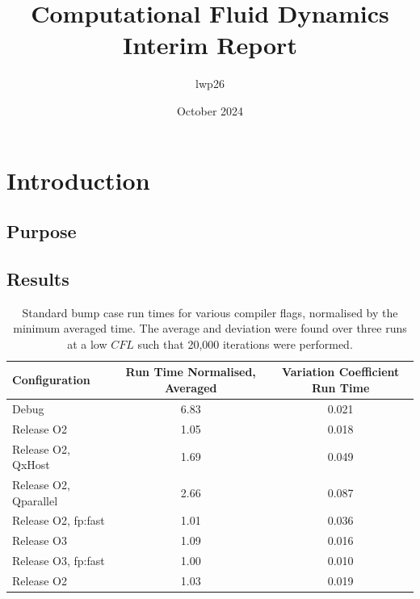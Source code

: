 \documentclass{article}
\begin{document}
\title{Computational Fluid Dynamics \\
    \large Interim Report}
\author{lwp26}
\date{October 2024}
\maketitle 

\section{Introduction}

\subsection{Purpose}


\subsection{Results}

\begin{table}[h!]
    \centering
    \begin{tabular}{lcc}
        \toprule
        \textbf{Configuration} & \textbf{Run Time Normalised, Averaged } & \textbf{Variation Coefficient Run Time} \\
        \midrule
        Debug & 6.83 & 0.021 \\
        Release O2 & 1.05 & 0.018 \\
        Release O2, QxHost & 1.69 & 0.049 \\
        Release O2, Qparallel & 2.66 & 0.087 \\
        Release O2, fp:fast & 1.01 & 0.036 \\
        Release O3 & 1.09 & 0.016 \\
        Release O3, fp:fast & 1.00 & 0.010 \\
        Release O2 & 1.03 & 0.019 \\
        \bottomrule
    \end{tabular}
    \caption{Standard bump case run times for various compiler flags, normalised by the minimum averaged time. The average and deviation were found over three runs at a low $CFL$ such that 20,000 iterations were performed.}
    \label{tab:performance}
\end{table}
\end{document}
